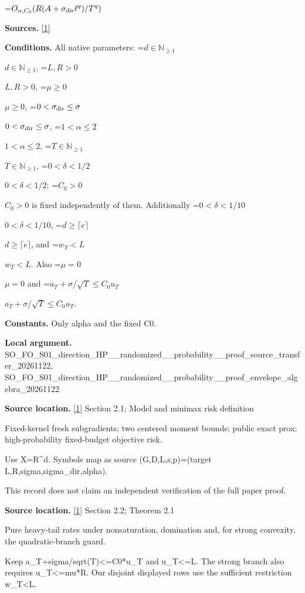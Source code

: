 \documentclass[10pt,a4paper]{article}
\newcommand{\AtlasMath}[1]{\par\begingroup\centering\setbox0=\hbox{$\displaystyle #1$}\ifdim\wd0>1.4\linewidth\typeout{ATLAS WIDE FORMULA: \the\wd0}\fi\ifdim\wd0>\linewidth\resizebox{\linewidth}{!}{\box0}\else\box0\fi\par\endgroup}
\newcommand{\AtlasInlineMath}[1]{\begingroup\setbox0=\hbox{$#1$}\ifdim\wd0>.4\linewidth\endgroup\AtlasMath{#1}\else\endgroup$#1$\fi}
\begin{document}
\AtlasMath{O_{\alpha,C_0}\!\left(R(A+\sigma_{\rm dir}\ell^q)/T^q\right)}


\textbf{Sources.} \href{https://arxiv.org/html/2610.00260v2}{[1]}



\textbf{Conditions.} All native parameters: \AtlasInlineMath{d\in\mathbb N_{\ge1}}, \AtlasInlineMath{L,R>0}, \AtlasInlineMath{\mu\ge0}, \AtlasInlineMath{0<\sigma_{\rm dir}\le\sigma}, \AtlasInlineMath{1<\alpha\le2}, \AtlasInlineMath{T\in\mathbb N_{\ge1}}, \AtlasInlineMath{0<\delta<1/2}; \AtlasInlineMath{C_0>0} is fixed independently of them. Additionally \AtlasInlineMath{0<\delta<1/10}, \AtlasInlineMath{d\ge\lceil e\rceil}, and \AtlasInlineMath{w_T<L}. Also \AtlasInlineMath{\mu=0} and \AtlasInlineMath{a_T+\sigma/\sqrt T\le C_0u_T}.



\textbf{Constants.} Only alpha and the fixed C0.



\textbf{Local argument.} SO\_FO\_S01\_direction\_HP\_\_\allowbreak{}randomized\_\_probability\_\allowbreak{}\_proof\_source\_transfer\_2\allowbreak{}0261122, SO\_FO\_S01\_direction\_HP\_\_\allowbreak{}randomized\_\_probability\_\allowbreak{}\_proof\_envelope\_algebra\_\allowbreak{}20261122



\textbf{Source location.} \href{https://arxiv.org/html/2610.00260v2}{[1]} Section 2.1; Model and minimax risk definition



Fixed-kernel fresh subgradients; two centered moment bounds; public exact prox; high-probability fixed-budget objective risk.



Use X=R\textasciicircum{}d. Symbols map as source (G,D,L,s,p)=(target L,R,sigma,sigma\_dir,alpha).



This record does not claim an independent verification of the full paper proof.



\textbf{Source location.} \href{https://arxiv.org/html/2610.00260v2}{[1]} Section 2.2; Theorem 2.1



Pure heavy-tail rates under nonsaturation, domination and, for strong convexity, the quadratic-branch guard.



Keep a\_T+sigma/sqrt(T)<=C0*u\_T and u\_T<=L. The strong branch also requires u\_T<=mu*R. Our disjoint displayed rows use the sufficient restriction w\_T<L.
\end{document}
